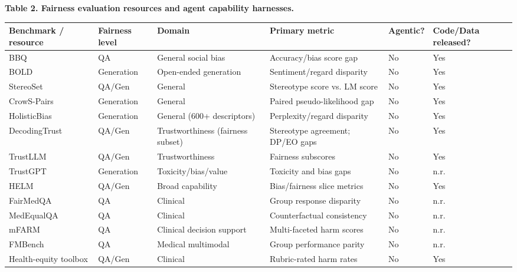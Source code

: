 \documentclass[10pt]{article}
\begin{document}
\textbf{Table 2. Fairness evaluation resources and agent capability harnesses.}

\begin{center}\footnotesize
\begin{longtable}{|p{}|p{}|p{}|p{}|p{}|p{}|}
\hline \textbf{Benchmark / resource} & \textbf{Fairness level} & \textbf{Domain} & \textbf{Primary metric} & \textbf{Agentic?} & \textbf{Code/Data released?} \\ \hline\endhead
BBQ \cite{parrish2022bbq} & QA & General social bias & Accuracy/bias score gap & No & Yes \\ \hline
BOLD \cite{dhamala2021bold} & Generation & Open-ended generation & Sentiment/regard disparity & No & Yes \\ \hline
StereoSet \cite{nadeem2021stereoset} & QA/Gen & General & Stereotype score vs. LM score & No & Yes \\ \hline
CrowS-Pairs \cite{nangia2020crows} & Generation & General & Paired pseudo-likelihood gap & No & Yes \\ \hline
HolisticBias \cite{smith2022sorry} & Generation & General (600+ descriptors) & Perplexity/regard disparity & No & Yes \\ \hline
DecodingTrust \cite{wang2023decodingtrust} & QA/Gen & Trustworthiness (fairness subset) & Stereotype agreement; DP/EO gaps & No & Yes \\ \hline
TrustLLM \cite{huang2024trustllm} & QA/Gen & Trustworthiness & Fairness subscores & No & Yes \\ \hline
TrustGPT \cite{huang2023trustgpt} & Generation & Toxicity/bias/value & Toxicity and bias gaps & No & n.r. \\ \hline
HELM \cite{liang2023holistic} & QA/Gen & Broad capability & Bias/fairness slice metrics & No & Yes \\ \hline
FairMedQA \cite{xiao2025fairmedqa} & QA & Clinical & Group response disparity & No & n.r. \\ \hline
MedEqualQA \cite{ghosh2025medequalqa} & QA & Clinical & Counterfactual consistency & No & n.r. \\ \hline
mFARM \cite{adappanavar2025mfarm} & QA & Clinical decision support & Multi-faceted harm scores & No & n.r. \\ \hline
FMBench \cite{wu2024fmbench} & QA & Medical multimodal & Group performance parity & No & n.r. \\ \hline
Health-equity toolbox \cite{pfohl2024toolbox} & QA/Gen & Clinical & Rubric-rated harm rates & No & Yes \\ \hline

\end{longtable}
\end{center}
\end{document}
